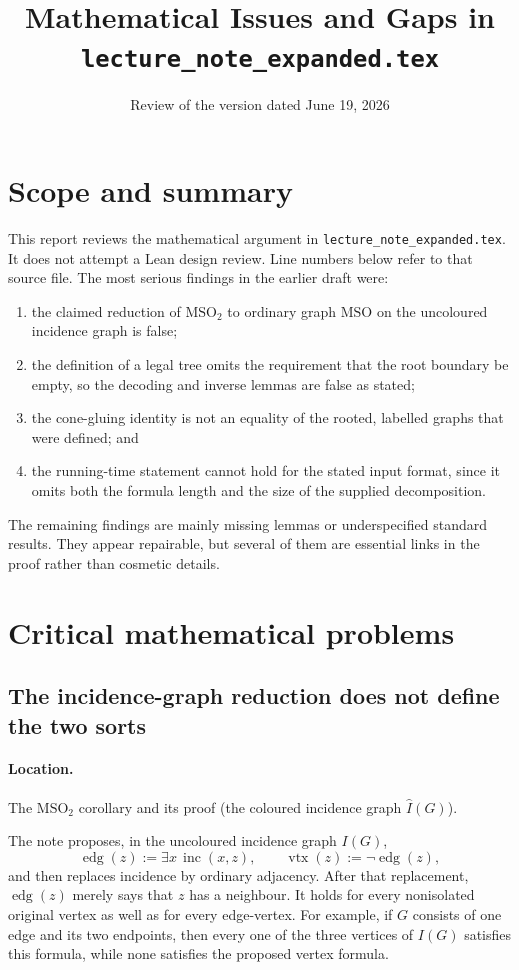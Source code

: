 \documentclass[11pt]{article}
\title{Mathematical Issues and Gaps in\\
  \texttt{lecture\_note\_expanded.tex}}
\author{}
\date{Review of the version dated June 19, 2026}
\newcommand{\MSO}{\ensuremath{\mathrm{MSO}}}
\newcommand{\MSOtwo}{\ensuremath{\mathrm{MSO}_2}}
\begin{document}
\maketitle

\section*{Scope and summary}

This report reviews the mathematical argument in
\texttt{lecture\_note\_expanded.tex}.  It does not attempt a Lean design review.
Line numbers below refer to that source file.  The most serious findings in the
earlier draft were:
\begin{enumerate}[label=\textbf{C\arabic*.},leftmargin=*]
  \item the claimed reduction of \MSOtwo{} to ordinary graph \MSO{} on the
    uncoloured incidence graph is false;
  \item the definition of a legal tree omits the requirement that the root
    boundary be empty, so the decoding and inverse lemmas are false as stated;
  \item the cone-gluing identity is not an equality of the rooted, labelled
    graphs that were defined; and
  \item the running-time statement cannot hold for the stated input format,
    since it omits both the formula length and the size of the supplied
    decomposition.
\end{enumerate}
The remaining findings are mainly missing lemmas or underspecified standard
results.  They appear repairable, but several of them are essential links in
the proof rather than cosmetic details.

\section{Critical mathematical problems}

\subsection{The incidence-graph reduction does not define the two sorts}

\paragraph{Location.} The \MSOtwo{} corollary and its proof (the coloured
incidence graph \(\widehat I(G)\)).

The note proposes, in the uncoloured incidence graph \(I(G)\),
\[
  \operatorname{edg}(z) := \exists x\,\operatorname{inc}(x,z),
  \qquad
  \operatorname{vtx}(z) := \neg\operatorname{edg}(z),
\]
and then replaces incidence by ordinary adjacency.  After that replacement,
\(\operatorname{edg}(z)\) merely says that \(z\) has a neighbour.  It holds for
every nonisolated original vertex as well as for every edge-vertex.  For
example, if \(G\) consists of one edge and its two endpoints, then every one of
the three vertices of \(I(G)\) satisfies this formula, while none satisfies the
proposed vertex formula.
\end{document}
